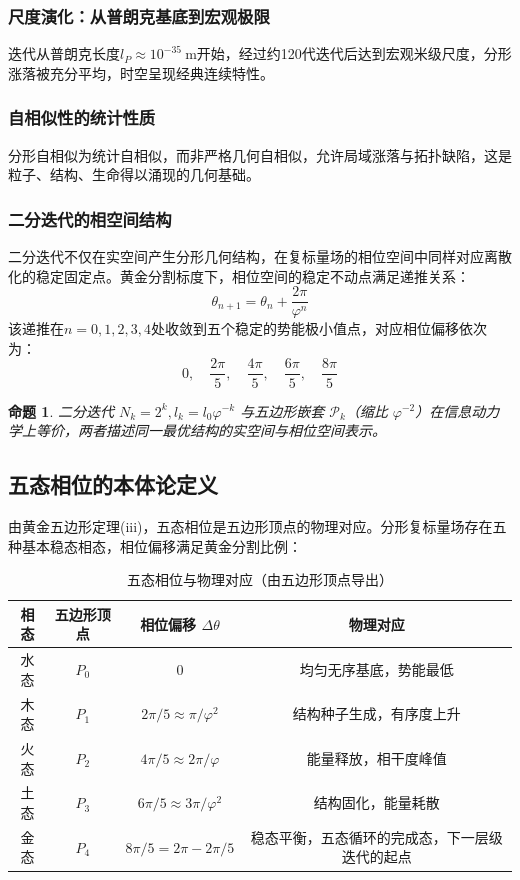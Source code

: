 \documentclass[12pt,a4paper,twocolumn]{article}
\renewcommand{\phi}{\varphi}
\newtheorem{proposition}[theorem]{命题}
\begin{document}
\subsubsection{尺度演化：从普朗克基底到宏观极限}
迭代从普朗克长度$l_P \approx 10^{-35}\ \text{m}$开始，经过约120代迭代后达到宏观米级尺度，分形涨落被充分平均，时空呈现经典连续特性。

\subsubsection{自相似性的统计性质}
分形自相似为统计自相似，而非严格几何自相似，允许局域涨落与拓扑缺陷，这是粒子、结构、生命得以涌现的几何基础。

\subsubsection{二分迭代的相空间结构}
二分迭代不仅在实空间产生分形几何结构，在复标量场的相位空间中同样对应离散化的稳定固定点。黄金分割标度下，相位空间的稳定不动点满足递推关系：
\[
\theta_{n+1} = \theta_n + \frac{2\pi}{\phi^n}
\]
该递推在$n=0,1,2,3,4$处收敛到五个稳定的势能极小值点，对应相位偏移依次为：
\[
0,\quad \frac{2\pi}{5},\quad \frac{4\pi}{5},\quad \frac{6\pi}{5},\quad \frac{8\pi}{5}
\]

\begin{proposition}
二分迭代 $N_k = 2^k, l_k = l_0 \phi^{-k}$ 与五边形嵌套 $\mathcal{P}_k$（缩比 $\phi^{-2}$）在信息动力学上等价，两者描述同一最优结构的实空间与相位空间表示。
\end{proposition}

\subsection{五态相位的本体论定义}
\label{subsec:five_states}

由黄金五边形定理(iii)，五态相位是五边形顶点的物理对应。分形复标量场存在五种基本稳态相态，相位偏移满足黄金分割比例：

\begin{table}[H]
\centering
\footnotesize
\caption{五态相位与物理对应（由五边形顶点导出）}
\begin{tabular}{c|c|c|c}
\hline
\textbf{相态} & \textbf{五边形顶点} & \textbf{相位偏移} $\Delta\theta$ & \textbf{物理对应} \\
\hline
水态 & $P_0$ & 0 & 均匀无序基底，势能最低 \\
木态 & $P_1$ & $2\pi/5 \approx \pi/\phi^2$ & 结构种子生成，有序度上升 \\
火态 & $P_2$ & $4\pi/5 \approx 2\pi/\phi$ & 能量释放，相干度峰值 \\
土态 & $P_3$ & $6\pi/5 \approx 3\pi/\phi^2$ & 结构固化，能量耗散 \\
金态 & $P_4$ & $8\pi/5 = 2\pi - 2\pi/5$ & 稳态平衡，五态循环的完成态，下一层级迭代的起点 \\
\hline
\end{tabular}
\end{table}
\end{document}
